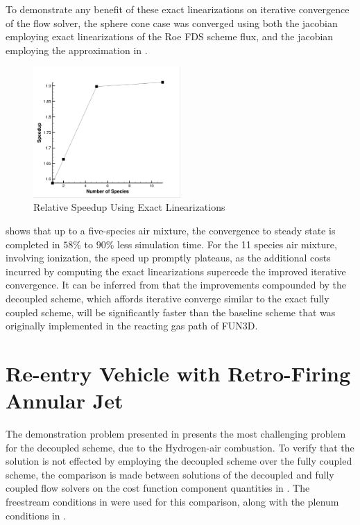 To demonstrate any benefit of these exact linearizations on iterative
convergence of the flow solver, the sphere cone case was converged using both
the jacobian employing exact linearizations of the Roe FDS scheme flux, and the
jacobian employing the approximation in .
\begin{figure}[h]
  \centering
  \includegraphics[width=0.5\textwidth]{figures/flow-efficiency/exact-approx-speedup.png}
  \caption{Relative Speedup Using Exact Linearizations}
  \label{fig:exact-approx-speedup}
\end{figure}
 shows that up to a five-species air mixture, the
convergence to steady state is completed in $58\%$ to $90\%$ less simulation
time.  For the 11 species air mixture, involving ionization, the speed up
promptly plateaus, as the additional costs incurred by computing the exact
linearizations supercede the improved iterative convergence.  It can be inferred
from  that the improvements compounded by the
decoupled scheme, which affords iterative converge similar to the exact fully
coupled scheme, will be significantly faster than the baseline scheme that was
originally implemented in the reacting gas path of FUN3D.

\section{Re-entry Vehicle with Retro-Firing Annular Jet}

The demonstration problem presented in 
presents the most challenging problem for the decoupled scheme, due to the
Hydrogen-air combustion.  To verify that the solution is not effected by
employing the decoupled scheme over the fully coupled scheme, the comparison is
made between solutions of the decoupled and fully coupled flow solvers on the
cost function component quantities in .  The
freestream conditions in  were used for this
comparison, along with the plenum conditions in .

